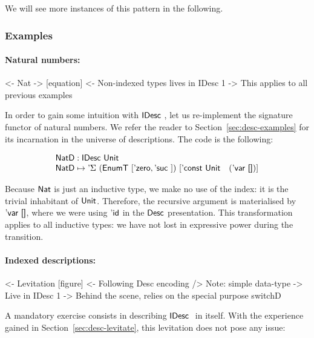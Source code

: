 We will see more instances of this pattern in the following.




\subsubsection{Examples}
\label{sec:idesc-examples}

\paragraph{Natural numbers:}

\begin{wstructure}
<- Nat
    -> [equation]
    <- Non-indexed types lives in IDesc 1
        -> This applies to all previous examples
\end{wstructure}

In order to gain some intuition with $\IDesc$, let us re-implement the
signature functor of natural numbers. We refer the reader to
Section~\ref{sec:desc-examples} for its incarnation in the universe of
descriptions. The code is the following:

\[\stk{
\NatD : \IDesc{\Unit} \\
\NatD \mapsto \DSigma{(\EnumT{[ \NatZero, \NatSuc{} ]})}
                     {[ \DConst{\Unit} \quad (\DVar{\Void}) ]}
}\]

Because $\Nat$ is just an inductive type, we make no use of the index:
it is the trivial inhabitant of $\Unit$. Therefore, the recursive
argument is materialised by $\DVar{\Void}$, where we were using $\DId$
in the $\Desc$ presentation. This transformation applies to all
inductive types: we have not lost in expressive power during the
transition.

\paragraph{Indexed descriptions:}

\begin{wstructure}
<- Levitation [figure]
    <- Following Desc encoding
        /> Note: simple data-type
            -> Live in IDesc 1
    -> Behind the scene, relies on the special purpose switchD
\end{wstructure}

A mandatory exercise consists in describing $\IDesc$ in itself. With
the experience gained in Section~\ref{sec:desc-levitate}, this
levitation does not pose any issue:

